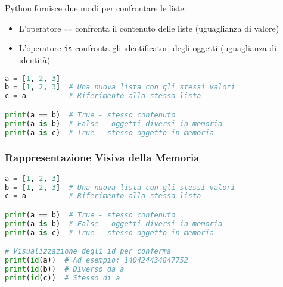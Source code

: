 Python fornisce due modi per confrontare le liste:
\begin{itemize}
    \item L'operatore \texttt{==} confronta il contenuto delle liste (uguaglianza di valore)
    \item L'operatore \texttt{is} confronta gli identificatori degli oggetti (uguaglianza di identità)
\end{itemize}

\begin{lstlisting}[language=Python]
a = [1, 2, 3]
b = [1, 2, 3]  # Una nuova lista con gli stessi valori
c = a          # Riferimento alla stessa lista

print(a == b)  # True - stesso contenuto
print(a is b)  # False - oggetti diversi in memoria
print(a is c)  # True - stesso oggetto in memoria
\end{lstlisting}

\subsubsection{Rappresentazione Visiva della Memoria}



\begin{lstlisting}[language=Python]
a = [1, 2, 3]
b = [1, 2, 3]  # Una nuova lista con gli stessi valori
c = a          # Riferimento alla stessa lista

print(a == b)  # True - stesso contenuto
print(a is b)  # False - oggetti diversi in memoria
print(a is c)  # True - stesso oggetto in memoria

# Visualizzazione degli id per conferma
print(id(a))  # Ad esempio: 140424434847752
print(id(b))  # Diverso da a
print(id(c))  # Stesso di a
\end{lstlisting}

